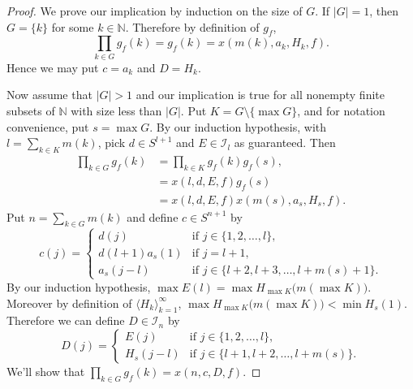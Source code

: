 \documentclass[12pt]{article}
\theoremstyle{plain}
\theoremstyle{definition}
\newcommand{\la}{\langle}
\newcommand{\ra}{\rangle}
\newcommand{\bbN}{\mathbb{N}}
\newcommand{\calI}{\mathcal{I}}
\begin{document}
\begin{proof}
  We prove our implication by induction on the size of $G$. 
  If $|G| = 1$, then $G = \{k\}$ for some $k \in \bbN$.
  Therefore by definition of $g_f$,
  \[
    \prod_{k \in G} g_f(k) = g_f(k) = x(m(k), a_k, H_k, f).
  \]
  Hence we may put $c = a_k$ and $D = H_k$.

  Now assume that $|G| > 1$ and our implication is true for all
  nonempty finite subsets of $\bbN$ with size less than $|G|$. 
  Put $K = G \setminus \{\max G\}$, and for notation convenience, put $s
  = \max G$. 
  By our induction hypothesis, with $l = \sum_{k \in K} m(k)$, pick $d
  \in S^{l+1}$ and $E \in \calI_l$ as guaranteed. 
  Then 
  \begin{align*}
    \prod_{k \in G} g_f(k) &= \prod_{k \in K} g_f(k) g_f(s), \\
    &= x(l, d, E, f) g_f(s) \\
    &= x(l, d, E,f) x(m(s), a_s, H_s, f).
  \end{align*}
  Put $n = \sum_{k \in G} m(k)$ and define $c \in S^{n+1}$ by 
  \[
    c(j) = 
    \begin{cases}
      d(j) & \mbox{if $j \in \{1, 2, \ldots, l\}$,} \\
      d(l+1)a_s(1) & \mbox{if $j = l+1$,} \\
      a_s(j-l) & \mbox{if $j \in \{l+2, l+3, \ldots, l+m(s)+ 1\}$.}
    \end{cases}
  \]
  By our induction hypothesis, $\max E(l) = \max H_{\max
    K}\bigl(m(\max K)\bigr)$.
  Moreover by definition of $\la H_k \ra_{k=1}^\infty$, $\max H_{\max
    K}\bigl(m(\max K)\bigr) < \min H_s(1)$. 
  Therefore we can define $D \in \calI_n$ by
  \[
    D(j) = 
    \begin{cases}
      E(j) & \mbox{if $j \in \{1, 2, \ldots, l\}$,} \\
      H_s(j-l) & \mbox{if $j \in \{l+1, l+2, \ldots, l+m(s) \}$.}
    \end{cases}
  \]
  We'll show that $\prod_{k \in G} g_f(k) = x(n, c, D, f)$. 
  

\end{proof}
\end{document}
